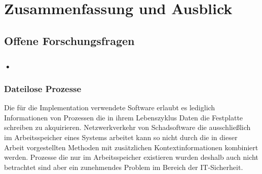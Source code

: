 \chapter{Zusammenfassung und Ausblick}%
\label{cha:conclusion}


\section{Offene Forschungsfragen}
\subsection{•} 
\subsection{Dateilose Prozesse}
Die für die Implementation verwendete Software erlaubt es lediglich Informationen von Prozessen die in ihrem Lebenszyklus Daten die Festplatte schreiben zu akquirieren. Netzwerkverkehr von Schadsoftware die ausschließlich im Arbeitsspeicher eines Systems arbeitet kann so nicht durch die in dieser Arbeit vorgestellten Methoden mit zusätzlichen Kontextinformationen kombiniert werden. Prozesse die nur im Arbeitsspeicher existieren wurden deshalb auch nicht betrachtet sind aber ein zunehmendes Problem im Bereich der IT-Sicherheit.
